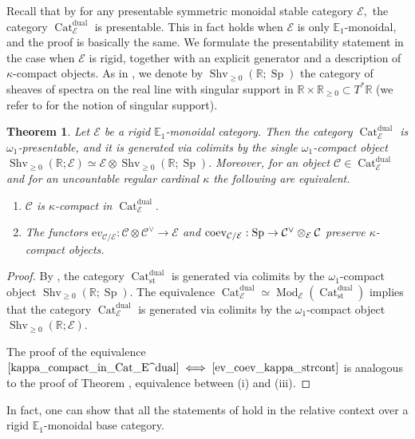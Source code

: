 \documentclass[11pt,leqno]{amsart}
\newcommand{\Iff}[2]{$\text{\ref{#1}}\iff\text{\ref{#2}}$}
\newtheorem{theo}{Theorem}[section]
\numberwithin{equation}{section}
\def\R{\mathbb{R}}
\newcommand{\tens}[1]{%
  \mathbin{\mathop{\otimes}\displaylimits_{#1}}%
}
\newcommand{\Cat}{\operatorname{Cat}}
\newcommand{\st}{\operatorname{st}}
\newcommand{\dual}{\operatorname{dual}}
\newcommand{\bE}{{\mathbb E}}
\newcommand{\ev}{\mathrm ev}
\newcommand{\cC}{{\mathcal C}}
\newcommand{\cE}{{\mathcal E}}
\newcommand{\Shv}{\operatorname{Shv}}
\newcommand{\Sp}{\operatorname{Sp}}
\newcommand{\coev}{\operatorname{coev}}
\newcommand{\Mod}{\operatorname{Mod}}
\begin{document}
Recall that by \cite[Theorem A]{Ram24a} for any presentable symmetric monoidal stable category $\cE,$ the category $\Cat_{\cE}^{\dual}$ is presentable. This in fact holds when $\cE$ is only $\bE_1$-monoidal, and the proof is basically the same.
We formulate the presentability statement in the case when $\cE$ is rigid, together with an explicit generator and a description of $\kappa$-compact objects. As in \cite[Section 4.4]{E24}, we denote by $\Shv_{\geq 0}(\R;\Sp)$ the category of sheaves of spectra on the real line with singular support in $\R\times\R_{\geq 0}\subset T^*\R$ (we refer to \cite{KS, RS} for the notion of singular support).

\begin{theo}\label{th:presentability_of_Cat_E^dual}
Let $\cE$ be a rigid $\bE_1$-monoidal category. Then the category $\Cat_{\cE}^{\dual}$ is $\omega_1$-presentable, and it is generated via colimits by the single $\omega_1$-compact object $\Shv_{\geq 0}(\R;\cE)\simeq\cE\otimes\Shv_{\geq 0}(\R;\Sp).$ Moreover, for an object $\cC\in\Cat_{\cE}^{\dual}$ and for an uncountable regular cardinal $\kappa$ the following are equivalent.
\begin{enumerate}[label=(\roman*),ref=(\roman*)]
\item $\cC$ is $\kappa$-compact in $\Cat_{\cE}^{\dual}.$ \label{kappa_compact_in_Cat_E^dual}
\item The functors $\ev_{\cC/\cE}:\cC\otimes\cC^{\vee}\to\cE$ and $\coev_{\cC/\cE}:\Sp\to\cC^{\vee}\tens{\cE}\cC$ preserve $\kappa$-compact objects. \label{ev_coev_kappa_strcont}
\end{enumerate}
\end{theo}

\begin{proof}
By \cite[Theorem D.1]{E24}, the category $\Cat_{\st}^{\dual}$ is generated via colimits by the $\omega_1$-compact object $\Shv_{\geq 0}(\R;\Sp).$ The equivalence $\Cat_{\cE}^{\dual}\simeq \Mod_{\cE}(\Cat_{\st}^{\dual})$ implies that the category $\Cat_{\cE}^{\dual}$ is generated via colimits by the $\omega_1$-compact object $\Shv_{\geq 0}(\R;\cE).$

The proof of the equivalence \Iff{kappa_compact_in_Cat_E^dual}{ev_coev_kappa_strcont} is analogous to the proof of Theorem \cite[Theorem C.6]{E24}, equivalence between (i) and (iii). 
\end{proof}
In fact, one can show that all the statements of \cite[Theorem C.6]{E24} hold in the relative context over a rigid $\bE_1$-monoidal base category. 
\end{document}

